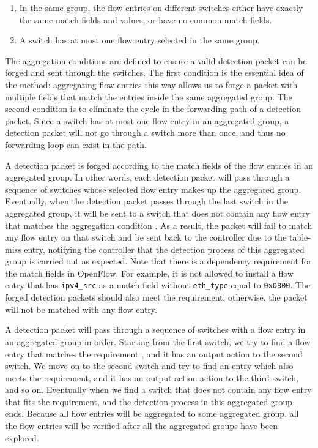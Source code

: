 \begin{enumerate}
\item
In the same group, the flow entries on different switches either have exactly the same match fields and values, or have no common match fields.
\item
A switch has at most one flow entry selected in the same group. 
\end{enumerate}

The aggregation conditions are defined to ensure a valid detection packet can be forged and sent through the switches. The first condition is the essential idea of the method: aggregating flow entries this way allows us to forge a packet with multiple fields that match the entries inside the same aggregated group. The second condition is to eliminate the cycle in the forwarding path of a detection packet. Since a switch has at most one flow entry in an aggregated group, a detection packet will not go through a switch more than once, and thus no forwarding loop can exist in the path.

A detection packet is forged according to the match fields of the flow entries in an aggregated group. In other words, each detection packet will pass through a sequence of switches whose selected flow entry makes up the aggregated group. Eventually, when the detection packet passes through the last switch in the aggregated group, it will be sent to a switch that does not contain any flow entry that matches the aggregation condition . As a result, the packet will fail to match any flow entry on that switch and be sent back to the controller due to the table-miss entry, notifying the controller that the detection process of this aggregated group is carried out as expected. Note that there is a dependency requirement for the match fields in OpenFlow. For example, it is not allowed to install a flow entry that has \texttt{ipv4\_src} as a match field without \texttt{eth\_type} equal to \texttt{0x0800}. The forged detection packets should also meet the requirement; otherwise, the packet will not be matched with any flow entry.

A detection packet will pass through a sequence of switches with a flow entry in an aggregated group in order. Starting from the first switch, we try to find a flow entry that matches the requirement , and it has an output action to the second switch. We move on to the second switch and try to find an entry which also meets the requirement, and it has an output action action to the third switch, and so on. Eventually when we find a switch that does not contain any flow entry that fits the requirement, and the detection process in this aggregated group ends. Because all flow entries will be aggregated to some aggregated group, all the flow entries will be verified after all the aggregated groups have been explored.

